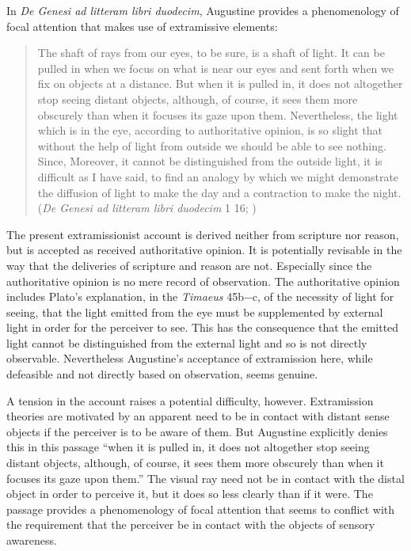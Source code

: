 \documentclass[12pt]{article}
\begin{document}
In \emph{De Genesi ad litteram libri duodecim}, Augustine provides a phenomenology of focal attention that makes use of extramissive elements:
\begin{quote}
	The shaft of rays from our eyes, to be sure, is a shaft of light. It can be pulled in when we focus on what is near our eyes and sent forth when we fix on objects at a distance. But when it is pulled in, it does not altogether stop seeing distant objects, although, of course, it sees them more obscurely than when it focuses its gaze upon them. Nevertheless, the light which is in the eye, according to authoritative opinion, is so slight that without the help of light from outside we should be able to see nothing. Since, Moreover, it cannot be distinguished from the outside light, it is difficult as I have said, to find an analogy by which we might demonstrate the diffusion of light to make the day and a contraction to make the night. (\emph{De Genesi ad litteram libri duodecim} 1 16; \citealt[37--38]{Taylor:1982aa})
\end{quote}
The present extramissionist account is derived neither from scripture nor reason, but is accepted as received authoritative opinion. It is potentially revisable in the way that the deliveries of scripture and reason are not. Especially since the authoritative opinion is no mere record of observation. The authoritative opinion includes Plato's explanation, in the \emph{Timaeus} 45b−c, of the necessity of light for seeing, that the light emitted from the eye must be supplemented by external light in order for the perceiver to see. This has the consequence that the emitted light cannot be distinguished from the external light and so is not directly observable. Nevertheless Augustine's acceptance of extramission here, while defeasible and not directly based on observation, seems genuine. 

A tension in the account raises a potential difficulty, however. Extramission theories are motivated by an apparent need to be in contact with distant sense objects if the perceiver is to be aware of them. But Augustine explicitly denies this in this passage ``when it is pulled in, it does not altogether stop seeing distant objects, although, of course, it sees them more obscurely than when it focuses its gaze upon them.'' The visual ray need not be in contact with the distal object in order to perceive it, but it does so less clearly than if it were. The passage provides a phenomenology of focal attention that seems to conflict with the requirement that the perceiver be in contact with the objects of sensory awareness.
\end{document}

